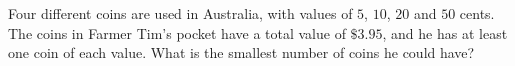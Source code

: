 Four different coins are used in Australia, with values of $5$, $10$, $20$ and $50$ cents. The coins in Farmer Tim's pocket have a total value of $\$3.95$, and he has at least one coin of each value. What is the smallest number of coins he could have?
